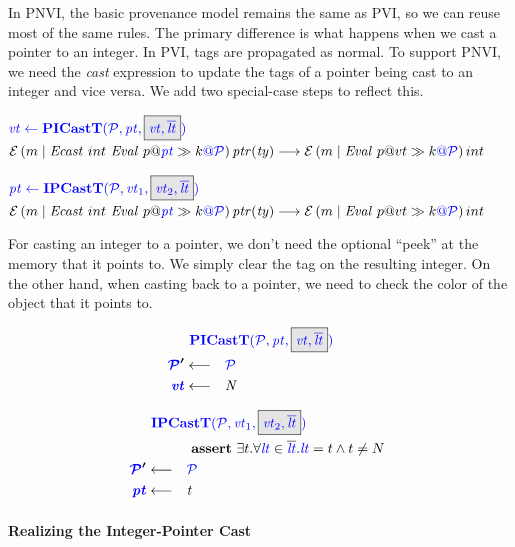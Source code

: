 \documentclass[acmsmall,review,anonymous]{acmart}\settopmatter{printfolios=true,printccs=false,printacmref=false}
\begin{document}

In PNVI, the basic provenance model remains the same as PVI, so we can reuse most of the
same rules. The primary difference is what happens when we cast a pointer to an integer.
In PVI, tags are propagated as normal.
To support PNVI, we need the {\it cast} expression to update the tags of a pointer
being cast to an integer and vice versa. We add two special-case steps to reflect this.

            {\(\trule{\picasttres}{\picastt}\)}
            {\(\mathcal{E}\left(m \mid \mathit{Ecast} ~ int ~ \mathit{Eval} ~ p@\mathit{\color{blue} pt} \gg k {\color{blue} @ \mathcal{\color{blue} P}}\right){\mathit{ptr(ty)}} \longrightarrow
              \mathcal{E}\left(m \mid \mathit{Eval} ~ p@vt \gg k {\color{blue} @ \mathcal{\color{blue} P}}\right){int}\)}

            {\(\trule{\ipcasttres}{\ipcastt}\)}
            {\(\mathcal{E}\left(m \mid \mathit{Ecast} ~ int ~ \mathit{Eval} ~ p@\mathit{\color{blue} pt} \gg k {\color{blue} @ \mathcal{\color{blue} P}}\right){\mathit{ptr(ty)}} \longrightarrow
              \mathcal{E}\left(m \mid \mathit{Eval} ~ p@vt \gg k {\color{blue} @ \mathcal{\color{blue} P}}\right){int}\)}

For casting an integer to a pointer, we don't need the optional ``peek'' at the memory that it points to.
We simply clear the tag on the resulting integer. On the other hand, when casting back to a pointer,
we need to check the color of the object that it points to.

\begin{minipage}{0.34\textwidth}
\[\begin{aligned}
\truledef{\picastt}
\settag{\PCT'}{\PCT}
\settag{\vt}{N}
\end{aligned}\]
\end{minipage}
\begin{minipage}{0.65\textwidth}
\[\begin{aligned}
\truledef{\ipcastt}
\assert{\exists t . \forall \lt \in \overline{\lt} . \lt = t \land t \not = N}
\settag{\PCT'}{\PCT}
\settag{\pt}{t}
\end{aligned}\]
\end{minipage}

\paragraph{Realizing the Integer-Pointer Cast}
\end{document}
